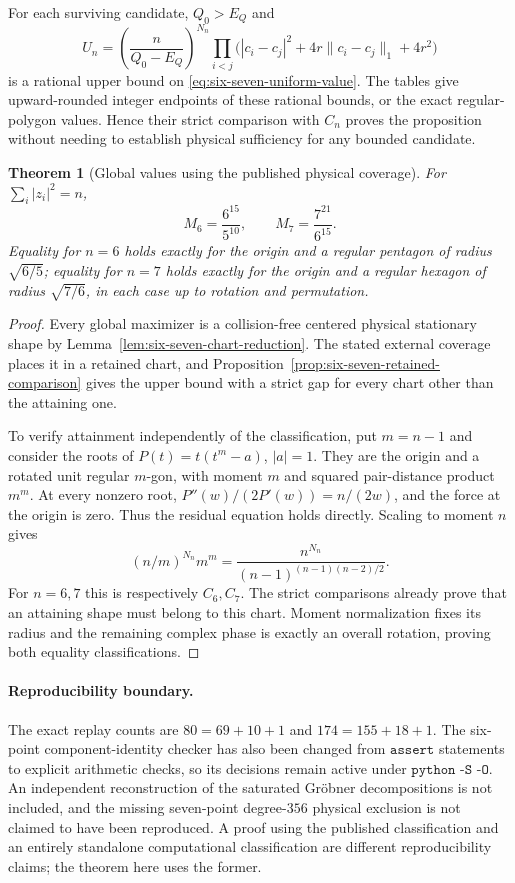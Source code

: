 \documentclass[11pt]{article}
\newtheorem{theorem}{Theorem}[section]
\theoremstyle{remark}
\numberwithin{equation}{section}
\begin{document}
For each surviving candidate, $Q_0>E_Q$ and
\begin{equation}\label{eq:six-seven-rational-upper}
 U_n=\left(\frac n{Q_0-E_Q}\right)^{N_n}
 \prod_{i<j}\bigl(|c_i-c_j|^2+4r\|c_i-c_j\|_1+4r^2\bigr)
\end{equation}
is a rational upper bound on \eqref{eq:six-seven-uniform-value}.
The tables give upward-rounded integer endpoints of these rational
bounds, or the exact regular-polygon values. Hence their strict
comparison with $C_n$ proves the proposition without needing to
establish physical sufficiency for any bounded candidate.

\begin{theorem}[Global values using the published physical coverage]
\label{thm:six-seven-global-improved}
For $\sum_i|z_i|^2=n$,
\[
 M_6=\frac{6^{15}}{5^{10}},\qquad
 M_7=\frac{7^{21}}{6^{15}}.
\]
Equality for $n=6$ holds exactly for the origin and a regular
pentagon of radius $\sqrt{6/5}$; equality for $n=7$ holds exactly
for the origin and a regular hexagon of radius $\sqrt{7/6}$,
in each case up to rotation and permutation.
\end{theorem}
\begin{proof}
Every global maximizer is a collision-free centered physical stationary
shape by Lemma~\ref{lem:six-seven-chart-reduction}. The stated external
coverage places it in a retained chart, and
Proposition~\ref{prop:six-seven-retained-comparison} gives the upper
bound with a strict gap for every chart other than the attaining one.

To verify attainment independently of the classification, put
$m=n-1$ and consider the roots of $P(t)=t(t^m-a)$, $|a|=1$.
They are the origin and a rotated unit regular $m$-gon, with moment
$m$ and squared pair-distance product $m^m$. At every nonzero root,
$P''(w)/(2P'(w))=n/(2w)$, and the force at the origin is zero.
Thus the residual equation holds directly. Scaling to moment $n$
gives
\[
 (n/m)^{N_n}m^m
 =\frac{n^{N_n}}{(n-1)^{(n-1)(n-2)/2}}.
\]
For $n=6,7$ this is respectively $C_6,C_7$.
The strict comparisons already prove that an attaining shape must
belong to this chart. Moment normalization fixes its radius and
the remaining complex phase is exactly an overall rotation, proving
both equality classifications.
\end{proof}

\paragraph{Reproducibility boundary.}
The exact replay counts are $80=69+10+1$ and $174=155+18+1$.
The six-point component-identity checker has also been changed from
$\texttt{assert}$ statements to explicit arithmetic checks, so its
decisions remain active under $\texttt{python -S -O}$.
An independent reconstruction of the saturated Gr\"obner decompositions
is not included, and the missing seven-point degree-$356$ physical
exclusion is not claimed to have been reproduced. A proof using the
published classification and an entirely standalone computational
classification are different reproducibility claims; the theorem here
uses the former.
\end{document}
